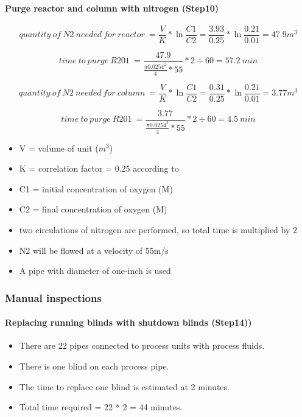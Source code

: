 \paragraph{Purge reactor and column with nitrogen (Step10)}

    \begin{equation}
        quantity\:of\:N2\:needed\:for\:reactor\:=\frac{V}{K} * \ln \frac{C1}{C2} = \frac{3.93}{0.25} * \ln \frac{0.21}{0.01} = 47.9 m^3
    \end{equation}
    
    \begin{equation}
        time\:to\:purge\:R201\:=\frac{47.9}{\frac{\pi 0.0254^2}{4} * 55} * 2 \div 60 = 57.2\:min
    \end{equation}
    
    \begin{equation}
        quantity\:of\:N2\:needed\:for\:column\:=\frac{V}{K} * \ln \frac{C1}{C2} = \frac{0.31}{0.25} * \ln \frac{0.21}{0.01} = 3.77 m^3
    \end{equation}
    
    \begin{equation}
        time\:to\:purge\:R201\:=\frac{3.77}{\frac{\pi 0.0254^2}{4} * 55} * 2 \div 60 = 4.5\:min
    \end{equation}
    
    \begin{itemize}
        \item V = volume of unit ($m^3$)
        \item K = correlation factor = 0.25 according to \textcite{}
        \item C1 = initial concentration of oxygen (M)
        \item C2 = final concentration of oxygen (M)
        \item two circulations of nitrogen are performed, so total time is multiplied by 2
        \item N2 will be flowed at a velocity of 55m/s
        \item A pipe with diameter of one-inch is used
    \end{itemize}

\subsubsection{Manual inspections} 
\paragraph{Replacing running blinds with shutdown blinds (Step14))}
    \begin{itemize}
        \item There are 22 pipes connected to process units with process fluids.
        \item There is one blind on each process pipe.
        \item The time to replace one blind is estimated at 2 minutes.
        \item Total time required = 22 * 2 = 44 minutes.
    \end{itemize}
    

